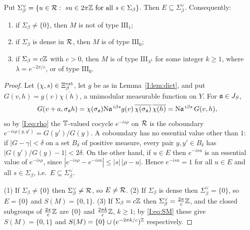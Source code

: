 \begin{proposition}\label{I:prop:bound}
Put $\Sigma_\beta^\vee=\{u\in\mathcal{R}:\ su\in2\pi\mathbb{Z}\ \text{for all}\ s\in\Sigma_\beta\}$. Then
$E\subseteq\Sigma_\beta^\vee$. Consequently:
\begin{enumerate}
\item if $\Sigma_\beta\ne\{0\}$, then $M$ is not of type $\mathrm{III}_1$;
\item if $\Sigma_\beta$ is dense in $\mathcal{R}$, then $M$ is of type $\mathrm{III}_0$;
\item if $\Sigma_\beta=c\mathbb{Z}$ with $c>0$, then $M$ is of type $\mathrm{III}_{\lambda^k}$ for
some integer $k\ge1$, where $\lambda=e^{-2\pi/c}$, or of type $\mathrm{III}_0$.
\end{enumerate}
\end{proposition}

\begin{proof}
Let $(\chi,s)\in\Xi^{\mathrm{ext}}_\beta$, let $g$ be as in Lemma~\ref{I:lem:dict}, and put
$G(v,h)=g(v)\overline{\chi(h)}$, a unimodular measurable function on $Y$. For $\mathfrak{a}\in J_S$,
\[
G(v+a,\sigma_{\mathfrak{a}} h)=\chi(\sigma_{\mathfrak{a}})\mathrm{N}\mathfrak{a}^{\,i\beta s}g(v)\,\overline{\chi(\sigma_{\mathfrak{a}})}\,\overline{\chi(h)}
=\mathrm{N}\mathfrak{a}^{\,i\beta s}\,G(v,h),
\]
so by \eqref{I:eq:rho} the $\mathbb{T}$-valued cocycle $e^{-is\rho}$ on $\mathcal{R}$ is the coboundary
$e^{-is\rho(y,y')}=G(y')/G(y)$. A coboundary has no essential value other than $1$: if
$|G-\gamma|<\delta$ on a set $B_\delta$ of positive measure, every pair $y,y'\in B_\delta$
has $|G(y')/G(y)-1|<2\delta$. On the other hand, if $u\in E$ then $e^{-isu}$ is an essential
value of $e^{-is\rho}$, since $|e^{-is\rho}-e^{-isu}|\le|s|\,|\rho-u|$. Hence
$e^{-isu}=1$ for all $u\in E$ and all $s\in\Sigma_\beta$, i.e.\ $E\subseteq\Sigma_\beta^\vee$.

(1) If $\Sigma_\beta\ne\{0\}$ then $\Sigma_\beta^\vee\ne\mathcal{R}$, so $E\ne\mathcal{R}$. (2) If $\Sigma_\beta$
is dense then $\Sigma_\beta^\vee=\{0\}$, so $E=\{0\}$ and $S(M)=\{0,1\}$. (3) If
$\Sigma_\beta=c\mathbb{Z}$ then $\Sigma_\beta^\vee=\frac{2\pi}{c}\mathbb{Z}$, and the closed subgroups of
$\frac{2\pi}{c}\mathbb{Z}$ are $\{0\}$ and $\frac{2\pi k}{c}\mathbb{Z}$, $k\ge1$; by \eqref{I:eq:SM} these give
$S(M)=\{0,1\}$ and $S(M)=\{0\}\cup(e^{-2\pi k/c})^{\mathbb{Z}}$ respectively.
\end{proof}

